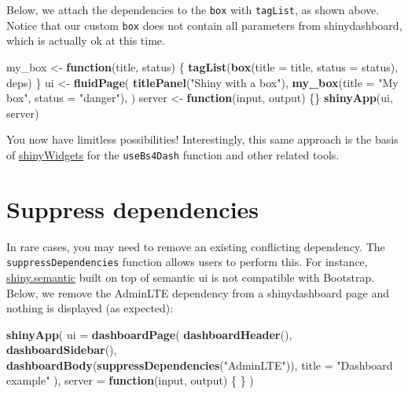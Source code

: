 \documentclass[
]{book}
\newenvironment{Shaded}{\begin{snugshade}}{\end{snugshade}}
\newcommand{\ControlFlowTok}[1]{\textcolor[rgb]{0.13,0.29,0.53}{\textbf{#1}}}
\newcommand{\DataTypeTok}[1]{\textcolor[rgb]{0.13,0.29,0.53}{#1}}
\newcommand{\KeywordTok}[1]{\textcolor[rgb]{0.13,0.29,0.53}{\textbf{#1}}}
\newcommand{\NormalTok}[1]{#1}
\newcommand{\StringTok}[1]{\textcolor[rgb]{0.31,0.60,0.02}{#1}}
\begin{document}
Below, we attach the dependencies to the \texttt{box} with \texttt{tagList}, as shown above. Notice that our custom \texttt{box} does not contain all parameters from shinydashboard, which is actually ok at this time.

\begin{Shaded}
\begin{Highlighting}[]
\NormalTok{my_box <-}\StringTok{ }\ControlFlowTok{function}\NormalTok{(title, status) \{}
  \KeywordTok{tagList}\NormalTok{(}\KeywordTok{box}\NormalTok{(}\DataTypeTok{title =}\NormalTok{ title, }\DataTypeTok{status =}\NormalTok{ status), deps)}
\NormalTok{\}}
\NormalTok{ui <-}\StringTok{ }\KeywordTok{fluidPage}\NormalTok{(}
  \KeywordTok{titlePanel}\NormalTok{(}\StringTok{"Shiny with a box"}\NormalTok{),}
  \KeywordTok{my_box}\NormalTok{(}\DataTypeTok{title =} \StringTok{"My box"}\NormalTok{, }\DataTypeTok{status =} \StringTok{"danger"}\NormalTok{),}
\NormalTok{)}
\NormalTok{server <-}\StringTok{ }\ControlFlowTok{function}\NormalTok{(input, output) \{\}}
\KeywordTok{shinyApp}\NormalTok{(ui, server)}
\end{Highlighting}
\end{Shaded}

You now have limitless possibilities! Interestingly, this same approach is the basis of \href{https://github.com/dreamRs/shinyWidgets/blob/master/R/useBs4Dash.R}{shinyWidgets} for the \texttt{useBs4Dash} function and other related tools.

\hypertarget{suppress-dependencies}{%
\section{Suppress dependencies}\label{suppress-dependencies}}

In rare cases, you may need to remove an existing conflicting dependency. The \texttt{suppressDependencies} function allows users to perform this. For instance, \href{https://github.com/Appsilon/shiny.semantic}{shiny.semantic} built on top of
semantic ui is not compatible with Bootstrap. Below, we remove the AdminLTE dependency
from a shinydashboard page and nothing is displayed (as expected):

\begin{Shaded}
\begin{Highlighting}[]
\KeywordTok{shinyApp}\NormalTok{(}
  \DataTypeTok{ui =} \KeywordTok{dashboardPage}\NormalTok{(}
    \KeywordTok{dashboardHeader}\NormalTok{(),}
    \KeywordTok{dashboardSidebar}\NormalTok{(),}
    \KeywordTok{dashboardBody}\NormalTok{(}\KeywordTok{suppressDependencies}\NormalTok{(}\StringTok{"AdminLTE"}\NormalTok{)),}
    \DataTypeTok{title =} \StringTok{"Dashboard example"}
\NormalTok{  ),}
  \DataTypeTok{server =} \ControlFlowTok{function}\NormalTok{(input, output) \{ \}}
\NormalTok{)}
\end{Highlighting}
\end{Shaded}
\end{document}

